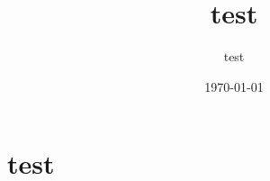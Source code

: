 \documentclass[11pt]{amsart}
\theoremstyle{definition}
\theoremstyle{remark}
\begin{document}
\title{test}
\author{test}
\address{test}

\date{\today}
\maketitle
\begin{abstract}
\end{abstract}
\setcounter{tocdepth}{3}

\section{test}





\end{document}

